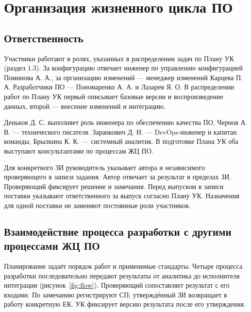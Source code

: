 \documentclass{tpks}
\begin{document}
\section{Организация жизненного цикла ПО}
\subsection{Ответственность}
Участники работают в ролях, указанных в распределении задач по Плану УК (раздел 1.3). За конфигурацию отвечает инженер по управлению конфигурацией Поминова А. А., за организацию изменений --- менеджер изменений Карцева П. А. Разработчики ПО --- Пономаренко А. А. и Лазарев Я. О. В распределении работ по Плану УК первый описывает базовые версии и воспроизведение данных, второй --- внесение изменений и интеграцию.

Деньков Д. С. выполняет роль инженера по обеспечению качества ПО, Чернов А. В. --- технического писателя. Заранкович Д. Н. --- DevOps-инженер и капитан команды, Брылкина К. К. --- системный аналитик. В подготовке Плана УК оба выступают консультантами по процессам ЖЦ ПО.

Для конкретного ЗИ руководитель указывает автора и независимого проверяющего в записи задания. Автор отвечает за результат в пределах ЗИ. Проверяющий фиксирует решение и замечания. Перед выпуском в записи поставки указывают ответственного за выпуск согласно Плану УК. Назначения для одной поставки не заменяют постоянные роли участников.

\subsection{Взаимодействие процесса разработки с другими процессами ЖЦ ПО}
Планирование задаёт порядок работ и применимые стандарты. Четыре процесса разработки последовательно передают результаты от аналитика до исполнителя интеграции (рисунок~\ref{fig:flow}). Проверяющий сопоставляет результат с его входами. По замечанию регистрируют СП; утверждённый ЗИ возвращает в работу конкретную ЕК. УК фиксирует версию результата после его утверждения.
\end{document}
